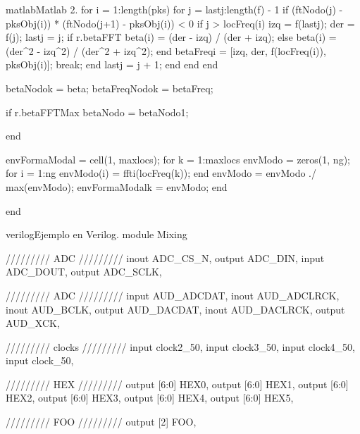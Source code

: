\begin{sourcecode}{matlab}{Matlab 2.}
    for i = 1:length(pks)
        for j = lastj:length(f) - 1 %
            if (ftNodo(j) - pksObj(i)) * (ftNodo(j+1) - pksObj(i)) < 0 %
                if j > locFreq(i)
                    izq = f(lastj);
                    der = f(j);
                    lastj = j;
                    if r.betaFFT
                        beta(i) = (der - izq) / (der + izq);
                    else
                        beta(i) = (der^2 - izq^2) / (der^2 + izq^2);
                    end
                    betaFreq{i} = [izq, der, f(locFreq(i)), pksObj(i)];
                    break;
                end
                lastj = j + 1; %
            end
        end %
    end %
    
    betaNodo{k} = beta;
    betaFreqNodo{k} = betaFreq;
    
    if r.betaFFTMax
        betaNodo = betaNodo{1};
    
end %

envFormaModal = cell(1, maxlocs);
for k = 1:maxlocs
    envModo = zeros(1, ng);
    for i = 1:ng %
        envModo(i) = fft{i}(locFreq(k));
    end %
    envModo = envModo ./ max(envModo);
    envFormaModal{k} = envModo;
end %

end %
\end{sourcecode}

\begin{sourcecode}{verilog}{Ejemplo en Verilog.}
module Mixing {
	///////// ADC /////////
	inout              ADC_CS_N,
	output             ADC_DIN,
	input              ADC_DOUT,
	output             ADC_SCLK,
	
	///////// ADC /////////
	input              AUD_ADCDAT,
	inout              AUD_ADCLRCK,
	inout              AUD_BCLK,
	output             AUD_DACDAT,
	inout              AUD_DACLRCK,
	output             AUD_XCK,
	
	///////// clocks /////////
	input              clock2_50,
	input              clock3_50,
	input              clock4_50,
	input              clock_50,
	
	///////// HEX /////////
	output      [6:0]  HEX0,
	output      [6:0]  HEX1,
	output      [6:0]  HEX2,
	output      [6:0]  HEX3,
	output      [6:0]  HEX4,
	output      [6:0]  HEX5,
	
	///////// FOO /////////
	output      [2]    FOO,
}
\end{sourcecode}

